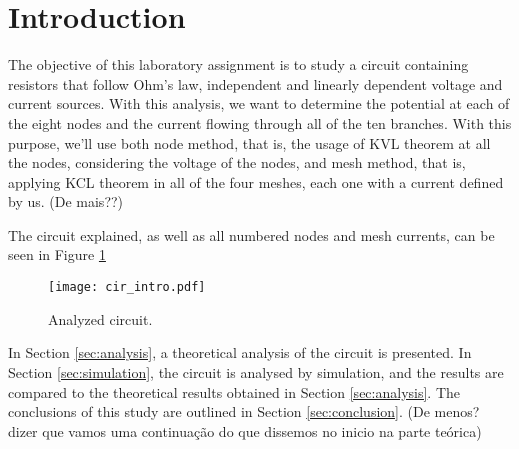 \section{Introduction}
\label{sec:introduction}

The objective of this laboratory assignment is to study a circuit containing resistors that follow Ohm's law, independent and linearly dependent voltage and current sources. With this analysis, we want to determine the potential at each of the eight nodes and the current flowing through all of the ten branches.
With this purpose, we'll use both node method, that is, the usage of KVL theorem at all the nodes, considering the voltage of the nodes, and mesh method, that is, applying KCL theorem in all of the four meshes, each one with a current defined by us. (De mais??)
\par
The circuit explained, as well as all numbered nodes and mesh currents, can be seen in Figure \ref{fig:cir_intro}

\begin{figure}[H] \centering
\texttt{[image: cir\_intro.pdf]}
\caption{Analyzed circuit.}
\label{fig:cir_intro}
\end{figure}


In Section \ref{sec:analysis}, a theoretical analysis of the circuit is
presented. In Section \ref{sec:simulation}, the circuit is analysed by
simulation, and the results are compared to the theoretical results obtained in
Section \ref{sec:analysis}. The conclusions of this study are outlined in
Section \ref{sec:conclusion}. (De menos? dizer que vamos uma continuação do que dissemos no inicio na parte teórica)
